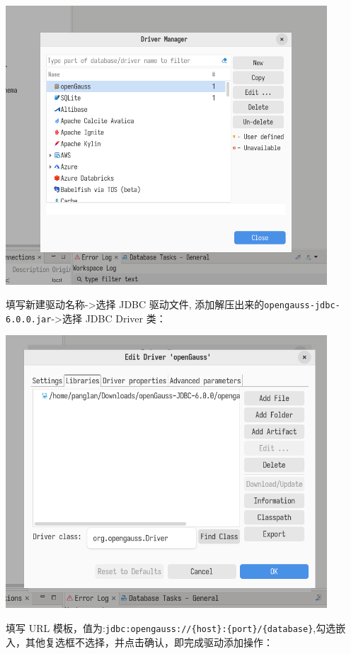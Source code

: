 \documentclass{article}
\begin{document}
\begin{center}
\includegraphics[width=12cm]{./image/1.png}
\end{center}

填写新建驱动名称->选择 JDBC 驱动文件, 添加解压出来的\verb|opengauss-jdbc-6.0.0.jar|->选择 JDBC Driver 类：

\begin{center}
\includegraphics[width=12cm]{./image/3.png}
\end{center}

填写 URL 模板，值为:\verb|jdbc:opengauss://{host}:{port}/{database}|,勾选嵌入，其他复选框不选择，并点击确认，即完成驱动添加操作：
\end{document}
